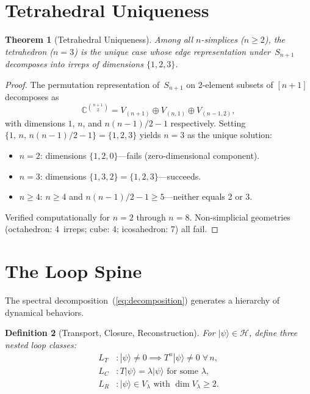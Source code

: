\documentclass[%
 aip,
 amsmath,amssymb,
 reprint,%
]{revtex4-1}
\newtheorem{theorem}{Theorem}
\newtheorem{definition}[theorem]{Definition}
\newcommand{\CC}{\mathbb{C}}
\newcommand{\HH}{\mathcal{H}}
\begin{document}
\section{\label{sec:uniqueness}Tetrahedral Uniqueness}

\begin{theorem}[Tetrahedral Uniqueness]\label{thm:uniqueness}
Among all $n$-simplices ($n\geq2$), the tetrahedron ($n=3$) is the unique case whose edge representation under~$S_{n+1}$ decomposes into irreps of dimensions $\{1,2,3\}$.
\end{theorem}

\begin{proof}
The permutation representation of~$S_{n+1}$ on 2-element subsets of $[n{+}1]$ decomposes as\cite{FultonHarris}
\begin{equation}\label{eq:simplex_decomp}
\CC^{\binom{n+1}{2}}=V_{(n+1)}\oplus V_{(n,1)}\oplus V_{(n-1,2)},
\end{equation}
with dimensions $1$, $n$, and $n(n{-}1)/2-1$ respectively. Setting $\{1,\,n,\,n(n{-}1)/2-1\}=\{1,2,3\}$ yields $n=3$ as the unique solution:
\begin{itemize}
\item $n=2$: dimensions $\{1,2,0\}$---fails (zero-dimensional component).
\item $n=3$: dimensions $\{1,3,2\}=\{1,2,3\}$---succeeds.
\item $n\geq4$: $n\geq4$ and $n(n{-}1)/2-1\geq5$---neither equals 2 or 3.
\end{itemize}
Verified computationally for $n=2$ through $n=8$. Non-simplicial geometries (octahedron: 4~irreps; cube: 4; icosahedron: 7) all fail.
\end{proof}


\section{\label{sec:spine}The Loop Spine}

The spectral decomposition~(\ref{eq:decomposition}) generates a hierarchy of dynamical behaviors.

\begin{definition}[Transport, Closure, Reconstruction]\label{def:TCR}
For $|\psi\rangle\in\HH$, define three nested loop classes:
\begin{align}
L_T &: |\psi\rangle\neq0 \implies T^n|\psi\rangle\neq0\;\forall\,n, \label{eq:LT}\\
L_C &: T|\psi\rangle=\lambda|\psi\rangle\text{ for some }\lambda, \label{eq:LC}\\
L_R &: |\psi\rangle\in V_\lambda\text{ with }\dim V_\lambda\geq2. \label{eq:LR}
\end{align}
\end{definition}
\end{document}
